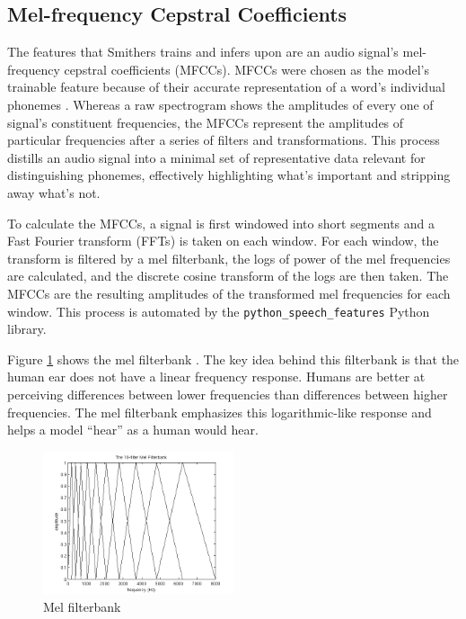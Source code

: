 \documentclass[conference]{IEEEtran}
\newcommand{\code}[1]{\texttt{#1}}
\begin{document}
\subsection{Mel-frequency Cepstral Coefficients} \label{sec:mfcc}
The features that Smithers trains and infers upon 
are an audio signal's mel-frequency cepstral coefficients (MFCCs).
MFCCs were chosen as the model's trainable feature because of their accurate representation
of a word's individual phonemes \cite{lyons}.
Whereas a raw spectrogram shows the amplitudes of every one of signal's constituent frequencies,
the MFCCs represent the amplitudes of particular frequencies after a series of filters and transformations.
This process distills an audio signal into a minimal set of representative data relevant for distinguishing phonemes, 
effectively highlighting what's important and stripping away what's not.

To calculate the MFCCs, a signal is first windowed into short segments
and a Fast Fourier transform (FFTs) is taken on each window.
For each window, the transform is filtered by a mel filterbank,
the logs of power of the mel frequencies are calculated,
and the discrete cosine transform of the logs are then taken.
The MFCCs are the resulting amplitudes of the transformed mel frequencies for each window.
This process is automated by the \code{python\_speech\_features} Python library.

Figure \ref{fig:filterbank} shows the mel filterbank \cite{lyons}.
The key idea behind this filterbank is that the human ear does not have a linear frequency response.
Humans are better at perceiving differences between lower frequencies
than differences between higher frequencies.
The mel filterbank emphasizes this logarithmic-like response and helps a model ``hear'' as a human would hear.

\begin{figure}[htbp]
    \centerline{\includegraphics[width=0.5\textwidth]{figs/filterbank.png}}
    \caption{Mel filterbank \cite{lyons}}
    \label{fig:filterbank}
\end{figure}
\end{document}
